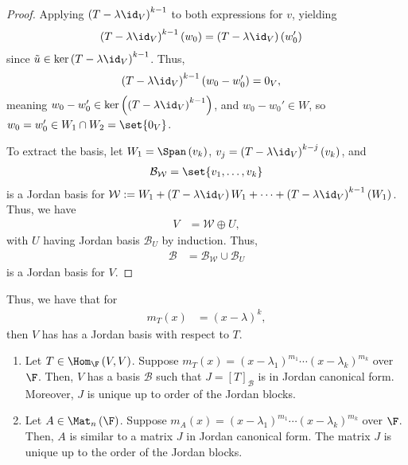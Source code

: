 \documentclass[10pt]{mypackage}
\begin{document}
\begin{proof}
  Applying $\left(T-\lambda\id_V\right)^{k-1}$ to both expressions for $v$, yielding
  \begin{align*}
    \left(T-\lambda\id_V\right)^{k-1}\left(w_0\right) &= \left(T-\lambda\id_V\right)\left(w_0'\right)
  \end{align*}
  since $\tilde{u}\in \ker\left(T-\lambda\id_V\right)^{k-1}$. Thus,
  \begin{align*}
    \left(T-\lambda\id_V\right)^{k-1}\left(w_0-w_0'\right) &= 0_V,
  \end{align*}
  meaning $w_0 - w_0'\in \ker\left(\left(T-\lambda\id_V\right)^{k-1}\right)$, and $w_0 - w_0'\in W$, so $w_0 = w_0'\in W_1\cap W_2 = \set{0_V}$.\newline

  To extract the basis, let $W_1 = \Span\left(v_k\right)$, $v_j = \left(T-\lambda\id_V\right)^{k-j}\left(v_k\right)$, and
  \begin{align*}
    \mathcal{B}_{\mathcal{W}} = \set{v_1,\dots,v_k}
  \end{align*}
  is a Jordan basis for $\mathcal{W} :=W_1 + \left(T-\lambda\id_V\right)W_1 + \cdots + \left(T-\lambda\id_V\right)^{k-1}\left(W_1\right)$. Thus, we have
  \begin{align*}
    V &= \mathcal{W}\oplus U,
  \end{align*}
  with $U$ having Jordan basis $\mathcal{B}_U$ by induction. Thus,
  \begin{align*}
    \mathcal{B} &= \mathcal{B}_{\mathcal{W}}\cup \mathcal{B}_U
  \end{align*}
  is a Jordan basis for $V$.
\end{proof}
Thus, we have that for
\begin{align*}
  m_T(x) &= \left(x-\lambda\right)^k,
\end{align*}
then $V$ has has a Jordan basis with respect to $T$.
\begin{theorem}\hfill
  \begin{enumerate}[(1)]
    \item Let $T\in \Hom_{\F}\left(V,V\right)$. Suppose $m_T(x) = \left(x-\lambda_1\right)^{m_1}\cdots \left(x-\lambda_k\right)^{m_k}$ over $\F$. Then, $V$ has a basis $\mathcal{B}$ such that $J = \left[T\right]_{\mathcal{B}}$ is in Jordan canonical form. Moreover, $J$ is unique up to order of the Jordan blocks.
    \item Let $A\in \Mat_{n}\left(\F\right)$. Suppose $m_A(x) = \left(x-\lambda_1\right)^{m_1}\cdots \left(x-\lambda_k\right)^{m_k}$ over $\F$. Then, $A$ is similar to a matrix $J$ in Jordan canonical form. The matrix $J$ is unique up to the order of the Jordan blocks.
  \end{enumerate}
\end{theorem}
\end{document}
